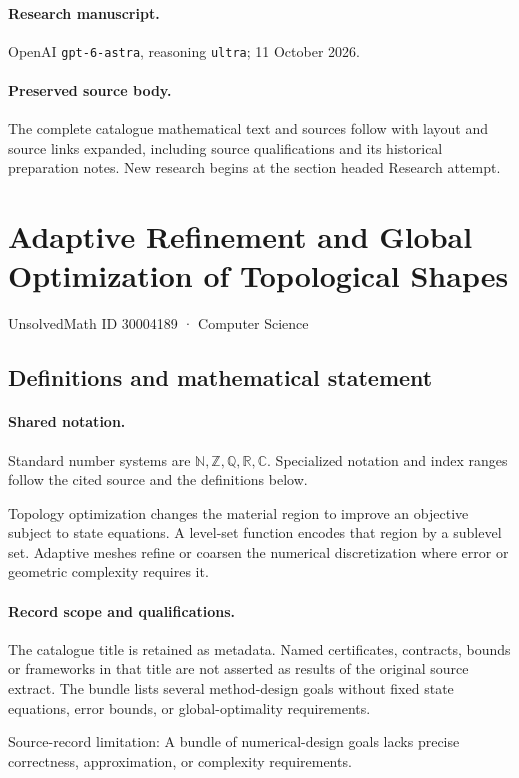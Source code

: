 \documentclass[11pt]{article}
\begin{document}
\paragraph{Research manuscript.} OpenAI \texttt{gpt-6-astra}, reasoning \texttt{ultra}; 11 October 2026.
\paragraph{Preserved source body.} The complete catalogue mathematical text and sources follow with layout and source links expanded, including source qualifications and its historical preparation notes. New research begins at the section headed Research attempt.

\section{Adaptive Refinement and Global Optimization of Topological Shapes}\label{30004189}
{\small UnsolvedMath ID 30004189 · Computer Science}
\subsection{Definitions and mathematical statement}

\paragraph{Shared notation.}Standard number systems are $\mathbb N,\mathbb Z,\mathbb Q,\mathbb R,\mathbb C$. Specialized notation and index ranges follow the cited source and the definitions below.


Topology optimization changes the material region to improve an objective subject to state equations. A level-set function encodes that region by a sublevel set. Adaptive meshes refine or coarsen the numerical discretization where error or geometric complexity requires it.
\paragraph{Record scope and qualifications.}
The catalogue title is retained as metadata. Named certificates, contracts, bounds or frameworks in that title are not asserted as results of the original source extract.
The bundle lists several method-design goals without fixed state equations, error bounds, or global-optimality requirements.

Source-record limitation: A bundle of numerical-design goals lacks precise correctness, approximation, or complexity requirements.
\end{document}
